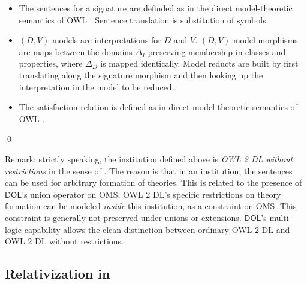 \documentclass[10pt,fleqn,final]{scrreprt}
\newcommand*{\DOL}{\ensuremath{\mathsf{DOL}}\xspace}
\newcommand{\ssclause}[1]{\subsection{#1}}
\newenvironment{definitions}[0]{\medskip }{}
\begin{document}
\begin{definitions}
\begin{definition}
\begin{itemize}
\begin{itemize}
\end{itemize}
\item The sentences for a signature are definded as in
the direct model-theoretic semantics of OWL \cite{w3c:owl2-direct-semantics}. Sentence translation is substitution of symbols.
\item  $(D,V)$-models are interpretations for $D$ and $V$. 
$(D,V)$-model morphisms are maps between the domains $\Delta_I$ preserving membership in classes and properties, where $\Delta_D$ is mapped identically. Model reducts are built by first translating along the signature morphism and then
looking up the interpretation in the model to be reduced.  
\item The satisfaction relation is defined as in direct model-theoretic semantics of OWL \cite{w3c:owl2-direct-semantics}.
\end{itemize}
\qed\end{definition}





Remark: strictly speaking, the institution defined above is
\emph{{OWL} 2 DL without restrictions} in the sense of
\cite{DBLP:conf/owled/SchneiderRS13}. The reason is that in an
institution, the sentences can be used for arbitrary formation of
theories. This is related to the presence of \DOL's union operator on
OMS.  OWL 2 DL's specific restrictions on theory formation can be
modeled \emph{inside} this institution, as a constraint on OMS.  This
constraint is generally not preserved under unions or
extensions. \DOL's multi-logic capability allows the clean distinction
between ordinary OWL 2 DL and {OWL} 2 DL without restrictions.

\ssclause{Relativization in \OWL}


\end{definitions}
\end{document}
